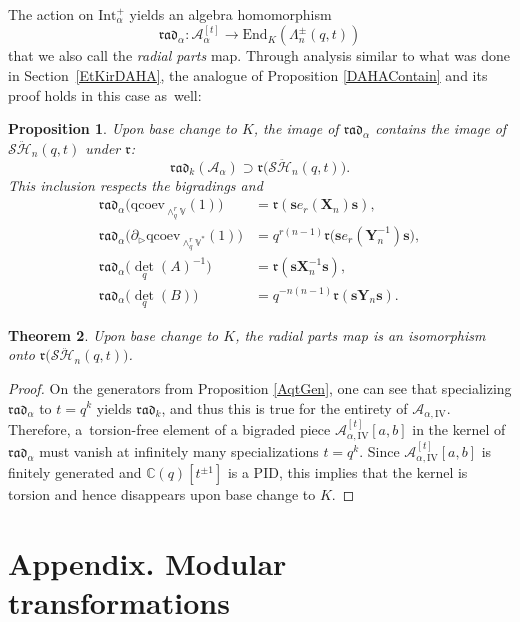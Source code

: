 \documentclass[11pt]{article}
\newtheorem{thm}{Theorem}[section]
\newtheorem{prop}[thm]{Proposition}
\theoremstyle{definition}
\newcommand{\CC}{\mathbb{C}}
\newcommand{\AAA}{\mathcal{A}}
\newcommand{\SHH}{\mathcal{S}\ddot{\mathcal{H}}}
\newcommand{\ee}{\boldsymbol{s}}
\newcommand{\rrr}{\mathfrak{r}}
\begin{document}
The action on $\mathrm{Int}_\alpha^+$ yields an algebra homomorphism
\[
\mathfrak{rad}_\alpha:\AAA^{[t]}_\alpha\to\mathrm{End}_K(\Lambda^\pm_n(q,t))
\]
that we also call the \textit{radial parts} map.
Through analysis similar to what was done in Section~\ref{EtKirDAHA}, the analogue of Proposition \ref{DAHAContain} and its proof holds in this case as~well:
\begin{prop}\label{tDAHAContain}
Upon base change to $K$, the image of $\mathfrak{rad}_\alpha$ contains the image of $\SHH_n(q,t)$ under $\rrr$:
\[
\mathfrak{rad}_k\left(\AAA_\alpha \right)\supset\rrr\bigl(\SHH_n(q,t) \bigr).
\]
This inclusion respects the bigradings and
\begin{equation*}
\begin{aligned}
\mathfrak{rad}_\alpha\bigl(\mathrm{qcoev}_{\wedge_q^r\mathbb{V}}(1) \bigr)&= \rrr(\ee e_r(\boldsymbol{X}_n)\ee),\\
\mathfrak{rad}_\alpha\bigl(\partial_\triangleright\mathrm{qcoev}_{\wedge_q^r\mathbb{V}^*}(1) \bigr)&= q^{r(n-1)}\rrr\bigl(\ee e_r(\boldsymbol{Y}^{-1}_n)\ee \bigr),\\
\mathfrak{rad}_\alpha\bigl(\textstyle\det_q(A)^{-1}\bigr)&= \rrr(\ee \boldsymbol{X}^{-1}_n\ee),\\
\mathfrak{rad}_\alpha\bigl(\textstyle\det_q(B)\bigr)&= q^{-n(n-1)}\rrr(\ee \boldsymbol{Y}_n\ee).
\end{aligned}
\end{equation*}
\end{prop}

\begin{thm}
Upon base change to $K$, the radial parts map is an isomorphism onto $\rrr\bigl(\SHH_n(q,t) \bigr)$.
\end{thm}

\begin{proof}
On the generators from Proposition \ref{AqtGen}, one can see that specializing $\mathfrak{rad}_\alpha$ to $t=q^k$ yields $\mathfrak{rad}_k$, and thus this is true for the entirety of $\AAA_{\alpha,\mathrm{IV}}$.
Therefore, a~torsion-free element of a bigraded piece $\AAA^{[t]}_{\alpha,\mathrm{IV}}[a,b]$ in the kernel of $\mathfrak{rad}_\alpha$ must vanish at infinitely many specializations $t=q^k$.
Since $\AAA_{\alpha,\mathrm{IV}}^{[t]}[a,b]$ is finitely generated and $\CC(q)[t^{\pm 1}]$ is a PID, this implies that the kernel is torsion and hence disappears upon base change to $K$.
\end{proof}

\appendix
{}
\section*{Appendix. Modular transformations}
\end{document}
